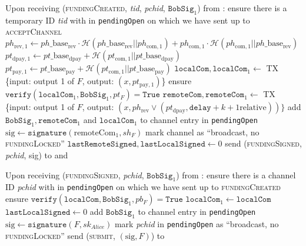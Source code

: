 \begin{algorithmic}[1]
    \State Upon receiving (\textsc{fundingCreated}, \textit{tid},
    \textit{pchid}, $\mathtt{BobSig}_1$) from \bob:
    \Indent
      \State ensure there is a temporary ID \textit{tid} with \bob{} in
      \texttt{pendingOpen} on which we have sent up to \textsc{acceptChannel}
      \State $ph_{\mathrm{rev}, 1} \gets ph\_\mathrm{base}_{\mathrm{rev}} \cdot
      \mathcal{H}\left(ph\_\mathrm{base}_{\mathrm{rev}} ||
      ph_{\mathrm{com}, 1}\right) + ph_{\mathrm{com}, 1} \cdot \mathcal{H}\left(
      ph_{\mathrm{com}, 1} || ph\_\mathrm{base}_{\mathrm{rev}}\right)$
      \State $pt_{\mathrm{dpay}, 1} \gets pt\_\mathrm{base}_{\mathrm{dpay}} +
      \mathcal{H}\left(pt_{\mathrm{com}, 1} ||
      pt\_\mathrm{base}_{\mathrm{dpay}}\right)$
      \State $pt_{\mathrm{pay}, 1} \gets pt\_\mathrm{base}_{\mathrm{pay}} +
      \mathcal{H}\left(pt_{\mathrm{com}, 1} ||
      pt\_\mathrm{base}_{\mathrm{pay}}\right)$
      \State $\mathtt{localCom}, \mathtt{localCom}_1 \gets$ TX \{input: output 1
      of $F$, output: $\left(x, pt_{\mathrm{pay}, 1}\right)$\}
      \State ensure $\mathtt{verify}\left(\mathtt{localCom}_1,
      \mathtt{BobSig}_1, pt_F\right) = \mathtt{True}$
      \State $\mathtt{remoteCom}, \mathtt{remoteCom}_1 \gets$ TX \{input: output
      1 of $F$, output: $\left(x, ph_{\mathrm{rev}} \vee
      \left(pt_{\mathrm{dpay}}, \mathtt{delay} + k + 1 \text{
      relative}\right)\right)\}$
      \State add $\mathtt{BobSig}_1, \mathtt{remoteCom}_1$ and
      $\mathtt{localCom}_1$ to channel entry in \texttt{pendingOpen}
      \State $\mathrm{sig} \gets \mathtt{signature}\left(\mathrm{remoteCom}_1,
      sh_F\right)$
      \State mark channel as ``broadcast, no \textsc{fundingLocked}''
      \State $\mathtt{lastRemoteSigned}, \mathtt{lastLocalSigned} \gets 0$
      \State send (\textsc{fundingSigned}, \textit{pchid}, sig) to \bob{} and
      \adversary
    \EndIndent
    \State

    \State Upon receiving (\textsc{fundingSigned}, \textit{pchid},
    $\mathtt{BobSig}_1$) from \bob:
    \Indent
      \State ensure there is a channel ID \textit{pchid} with \bob{} in
      \texttt{pendingOpen} on which we have sent up to \textsc{fundingCreated}
      \State ensure $\mathtt{verify}\left(\mathtt{localCom}, \mathtt{BobSig}_1,
      pb_F\right) = \mathtt{True}$
      \State $\mathtt{localCom}_1 \gets \mathtt{localCom}$
      \State $\mathtt{lastLocalSigned} \gets 0$
      \State add $\mathtt{BobSig}_1$ to channel entry in \texttt{pendingOpen}
      \State $\mathrm{sig} \gets \mathtt{signature}\left(F,
      sk_{\mathit{Alice}}\right)$
      \State mark \textit{pchid} in \texttt{pendingOpen} as ``broadcast, no
      \textsc{fundingLocked}''
      \State send (\textsc{submit}, $\left(\mathrm{sig}, F\right)$) to \ledger
    \EndIndent
    \State


\end{algorithmic}

